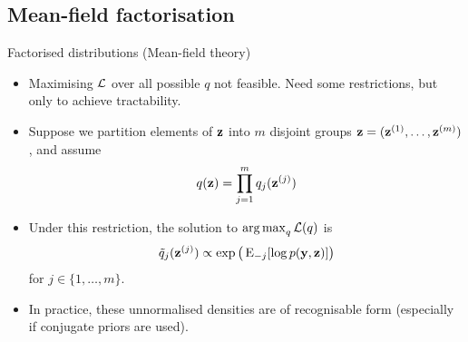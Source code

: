 \subsection{Mean-field factorisation}

\begin{frame}{Factorised distributions (Mean-field theory)}
  \vspace{-20pt}
  \begin{itemize}
    \item<1-> Maximising ${\mathcal L}$ over all possible $q$ not feasible. Need some restrictions, but only to achieve tractability.
    \item<1-> Suppose we partition elements of ${\mathbf z}$ into $m$ disjoint groups ${\mathbf z} = ({\mathbf z}^{(1)}, \dots, {\mathbf z}^{(m)})$, and assume
    \[
      q({\mathbf z}) = \prod_{j=1}^m q_j({\mathbf z}^{(j)})
    \]
    \item<2-> Under this restriction, the solution to $\operatorname*{arg\,max}_q {\mathcal L}(q)$ is
    \begin{align}\label{eq:meanfieldsoln}
      \tilde q_j({\mathbf z}^{(j)}) \propto \exp\big(\operatorname{E}_{-j}[\log p({\mathbf y},{\mathbf z})]\big)
    \end{align}
    for $j \in \{1,\dots,m\}$.
    \item<3-> In practice, these unnormalised densities are of recognisable form (especially if conjugate priors are used).
    \vspace{4pt}
  \end{itemize}
\end{frame}

